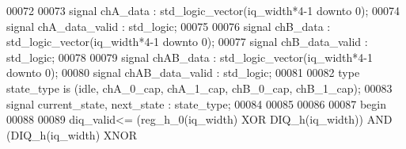 \begin{DoxyCode}
00072 
00073 \textcolor{keywordflow}{signal} \textcolor{vhdlchar}{chA_data}            \textcolor{vhdlchar}{:} \textcolor{comment}{std\_logic\_vector}\textcolor{vhdlchar}{(}\textcolor{vhdlchar}{iq_width}\textcolor{vhdlchar}{*}\textcolor{vhdllogic}{4-1} \textcolor{keywordflow}{downto} \textcolor{vhdllogic}{}\textcolor{vhdllogic}{0}\textcolor{vhdlchar}{)};
00074 \textcolor{keywordflow}{signal} \textcolor{vhdlchar}{chA_data_valid}      \textcolor{vhdlchar}{:} \textcolor{comment}{std\_logic};
00075 
00076 \textcolor{keywordflow}{signal} \textcolor{vhdlchar}{chB_data}            \textcolor{vhdlchar}{:} \textcolor{comment}{std\_logic\_vector}\textcolor{vhdlchar}{(}\textcolor{vhdlchar}{iq_width}\textcolor{vhdlchar}{*}\textcolor{vhdllogic}{4-1} \textcolor{keywordflow}{downto} \textcolor{vhdllogic}{}\textcolor{vhdllogic}{0}\textcolor{vhdlchar}{)};
00077 \textcolor{keywordflow}{signal} \textcolor{vhdlchar}{chB_data_valid}      \textcolor{vhdlchar}{:} \textcolor{comment}{std\_logic};
00078 
00079 \textcolor{keywordflow}{signal} \textcolor{vhdlchar}{chAB_data}               \textcolor{vhdlchar}{:} \textcolor{comment}{std\_logic\_vector}\textcolor{vhdlchar}{(}\textcolor{vhdlchar}{iq_width}\textcolor{vhdlchar}{*}\textcolor{vhdllogic}{4-1} \textcolor{keywordflow}{downto} \textcolor{vhdllogic}{}\textcolor{vhdllogic}{0}\textcolor{vhdlchar}{)};
00080 \textcolor{keywordflow}{signal} \textcolor{vhdlchar}{chAB_data_valid}     \textcolor{vhdlchar}{:} \textcolor{comment}{std\_logic};
00081 
00082 \textcolor{keywordflow}{type} \textcolor{vhdlchar}{state_type} \textcolor{keywordflow}{is} \textcolor{vhdlchar}{(}\textcolor{vhdlchar}{idle}\textcolor{vhdlchar}{,} \textcolor{vhdlchar}{chA\_0\_cap}\textcolor{vhdlchar}{,} \textcolor{vhdlchar}{chA\_1\_cap}\textcolor{vhdlchar}{,} \textcolor{vhdlchar}{chB\_0\_cap}\textcolor{vhdlchar}{,} \textcolor{vhdlchar}{chB\_1\_cap}\textcolor{vhdlchar}{)};
00083 \textcolor{keywordflow}{signal} \textcolor{vhdlchar}{current_state}\textcolor{vhdlchar}{,} \textcolor{vhdlchar}{next_state} \textcolor{vhdlchar}{:} \textcolor{vhdlchar}{state_type};
00084 
00085 
00086 
00087 \textcolor{vhdlkeyword}{begin}
00088  
00089  \textcolor{vhdlchar}{diq_valid}\textcolor{vhdlchar}{<=}   \textcolor{vhdlchar}{(}\textcolor{vhdlchar}{reg_h_0}\textcolor{vhdlchar}{(}\textcolor{vhdlchar}{iq_width}\textcolor{vhdlchar}{)} \textcolor{keywordflow}{XOR} \textcolor{vhdlchar}{DIQ_h}\textcolor{vhdlchar}{(}\textcolor{vhdlchar}{iq_width}\textcolor{vhdlchar}{)}\textcolor{vhdlchar}{)} \textcolor{keywordflow}{AND} \textcolor{vhdlchar}{(}\textcolor{vhdlchar}{DIQ_h}\textcolor{vhdlchar}{(}\textcolor{vhdlchar}{iq_width}\textcolor{vhdlchar}{)} \textcolor{keywordflow}{XNOR} \textcolor{vhdlchar}{
}
\end{DoxyCode}
